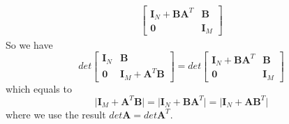 \documentclass[12pt, a4paper]{article}
\begin{document}
\begin{itemize}
\begin{align*}
\begin{bmatrix}
                \bm{I}_N+\bm{B}\bm{A}^T & \bm{B}\\
                \bm{0} & \bm{I}_M
            \end{bmatrix}
        \end{align*}
        So we have 
        \begin{equation*}
            det\begin{bmatrix}
                \bm{I}_N & \bm{B}\\
                \bm{0} & \bm{I}_M+\bm{A}^T\bm{B}
            \end{bmatrix}=det\begin{bmatrix}
                \bm{I}_N+\bm{B}\bm{A}^T & \bm{B}\\
                \bm{0} & \bm{I}_M
            \end{bmatrix}
        \end{equation*}
        which equals to
        \begin{equation*}
            \vert\bm{I}_M+\bm{A}^T\bm{B}\vert=\vert\bm{I}_N+\bm{B}\bm{A}^T\vert=
            \vert\bm{I}_N+\bm{A}\bm{B}^T\vert
        \end{equation*}
        where we use the result $det\bm{A}=det\bm{A}^T$.
    \end{itemize}
\end{document}
